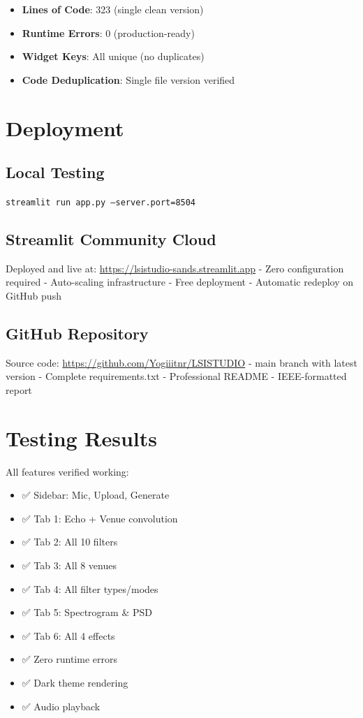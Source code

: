 \documentclass[twocolumn]{article}
\begin{document}
\begin{itemize}
    \item \textbf{Lines of Code}: 323 (single clean version)
    \item \textbf{Runtime Errors}: 0 (production-ready)
    \item \textbf{Widget Keys}: All unique (no duplicates)
    \item \textbf{Code Deduplication}: Single file version verified
\end{itemize}

\section{Deployment}

\subsection{Local Testing}
\texttt{streamlit run app.py --server.port=8504}

\subsection{Streamlit Community Cloud}
Deployed and live at: \url{https://lsistudio-sands.streamlit.app}
- Zero configuration required
- Auto-scaling infrastructure
- Free deployment
- Automatic redeploy on GitHub push

\subsection{GitHub Repository}
Source code: \url{https://github.com/Yogiiitnr/LSISTUDIO}
- main branch with latest version
- Complete requirements.txt
- Professional README
- IEEE-formatted report

\section{Testing Results}

All features verified working:
\begin{itemize}
    \item ✅ Sidebar: Mic, Upload, Generate
    \item ✅ Tab 1: Echo + Venue convolution
    \item ✅ Tab 2: All 10 filters
    \item ✅ Tab 3: All 8 venues
    \item ✅ Tab 4: All filter types/modes
    \item ✅ Tab 5: Spectrogram \& PSD
    \item ✅ Tab 6: All 4 effects
    \item ✅ Zero runtime errors
    \item ✅ Dark theme rendering
    \item ✅ Audio playback
\end{itemize}
\end{document}
